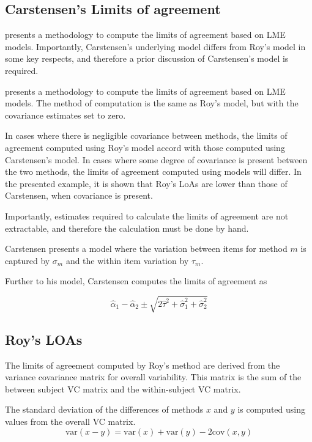 \documentclass[12pt, a4paper]{report}
\theoremstyle{plain}
\theoremstyle{definition}
\theoremstyle{remark}
\begin{document}
\subsection{Carstensen's Limits of agreement}
\citet{BXC2008} presents a methodology to compute the limits of
agreement based on LME models. Importantly, Carstensen's underlying model differs from Roy's model in some key respects, and therefore a prior discussion of Carstensen's model is required.

\citet{BXC2008} presents a methodology to compute the limits of agreement based on LME models. The method of computation is the same as Roy's model, but with the covariance estimates set to zero.

In cases where there is negligible covariance between methods, the limits of agreement computed using Roy's model accord with those computed using Carstensen's model. In cases where some degree of
covariance is present between the two methods, the limits of agreement computed using models will differ. In the presented example, it is shown that Roy's LoAs are lower than those of Carstensen, when covariance is present.

Importantly, estimates required to calculate the limits of agreement are not extractable, and therefore the calculation must be done by hand.


Carstensen presents a model where the variation between items for
method $m$ is captured by $\sigma_m$ and the within item variation
by $\tau_m$.

Further to his model, Carstensen computes the limits of agreement
as

\[
\hat{\alpha}_1 - \hat{\alpha}_2 \pm \sqrt{2 \hat{\tau}^2 +
	\hat{\sigma}^2_1 + \hat{\sigma}^2_2}
\]
\subsection{Roy's LOAs}

The limits of agreement computed by Roy's method are derived from the variance covariance matrix for overall variability.
This matrix is the sum of the between subject VC matrix and the within-subject VC matrix.

The standard deviation of the differences of methods $x$ and $y$ is computed using values from the overall VC matrix.
\[
\mbox{var}(x - y ) = \mbox{var} ( x )  + \mbox{var} ( y ) - 2\mbox{cov} ( x ,y )
\]
\end{document}
